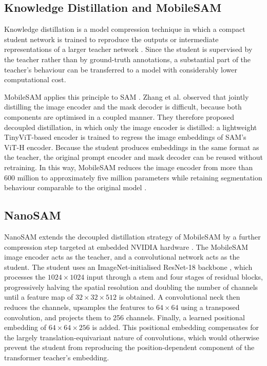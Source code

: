 {{\subsection{Knowledge Distillation and MobileSAM}
\label{subsec:mobilesam}

{\small
Knowledge distillation is a model compression technique in which a compact student network is trained to reproduce the outputs or intermediate representations of a larger teacher network \cite{hinton2015distilling}. Since the student is supervised by the teacher rather than by ground-truth annotations, a substantial part of the teacher's behaviour can be transferred to a model with considerably lower computational cost.

MobileSAM applies this principle to SAM \cite{zhang2023mobilesam}. Zhang et al. observed that jointly distilling the image encoder and the mask decoder is difficult, because both components are optimised in a coupled manner. They therefore proposed decoupled distillation, in which only the image encoder is distilled: a lightweight TinyViT-based encoder \cite{wu2022tinyvit} is trained to regress the image embeddings of SAM's ViT-H encoder. Because the student produces embeddings in the same format as the teacher, the original prompt encoder and mask decoder can be reused without retraining. In this way, MobileSAM reduces the image encoder from more than 600 million to approximately five million parameters while retaining segmentation behaviour comparable to the original model \cite{zhang2023mobilesam}.
}
\subsection{NanoSAM}
\label{subsec:nanosam_model}
{\small
NanoSAM extends the decoupled distillation strategy of MobileSAM by a further compression step targeted at embedded NVIDIA hardware \cite{nanosam2023}. The MobileSAM image encoder acts as the teacher, and a convolutional network acts as the student. The student uses an ImageNet-initialised ResNet-18 backbone \cite{he2016resnet}, which processes the $1024 \times 1024$ input through a stem and four stages of residual blocks, progressively halving the spatial resolution and doubling the number of channels until a feature map of $32 \times 32 \times 512$ is obtained. A convolutional neck then reduces the channels, upsamples the features to $64 \times 64$ using a transposed convolution, and projects them to 256 channels. Finally, a learned positional embedding of $64 \times 64 \times 256$ is added. This positional embedding compensates for the largely translation-equivariant nature of convolutions, which would otherwise prevent the student from reproducing the position-dependent component of the transformer teacher's embedding.

}}}
